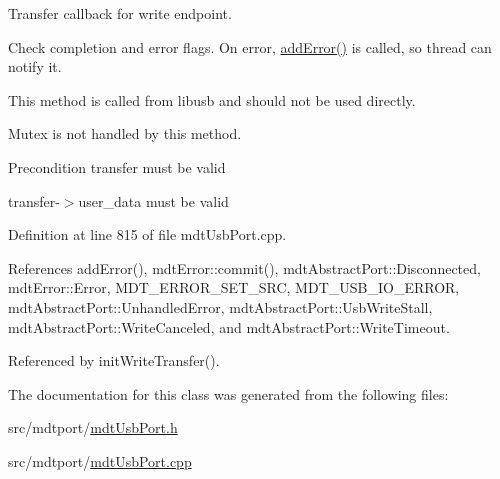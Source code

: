 Transfer callback for write endpoint. 

Check completion and error flags. On error, \hyperlink{classmdt_usb_port_aa857e94b4167c53b26573042ee3af280}{add\-Error()} is called, so thread can notify it.

This method is called from libusb and should not be used directly.

Mutex is not handled by this method.

\begin{DoxyPrecond}{Precondition}
transfer must be valid 

transfer-\/$>$user\-\_\-data must be valid 
\end{DoxyPrecond}


Definition at line 815 of file mdt\-Usb\-Port.\-cpp.



References add\-Error(), mdt\-Error\-::commit(), mdt\-Abstract\-Port\-::\-Disconnected, mdt\-Error\-::\-Error, M\-D\-T\-\_\-\-E\-R\-R\-O\-R\-\_\-\-S\-E\-T\-\_\-\-S\-R\-C, M\-D\-T\-\_\-\-U\-S\-B\-\_\-\-I\-O\-\_\-\-E\-R\-R\-O\-R, mdt\-Abstract\-Port\-::\-Unhandled\-Error, mdt\-Abstract\-Port\-::\-Usb\-Write\-Stall, mdt\-Abstract\-Port\-::\-Write\-Canceled, and mdt\-Abstract\-Port\-::\-Write\-Timeout.



Referenced by init\-Write\-Transfer().



The documentation for this class was generated from the following files\-:\begin{DoxyCompactItemize}
\item 
src/mdtport/\hyperlink{mdt_usb_port_8h}{mdt\-Usb\-Port.\-h}\item 
src/mdtport/\hyperlink{mdt_usb_port_8cpp}{mdt\-Usb\-Port.\-cpp}\end{DoxyCompactItemize}
